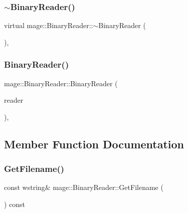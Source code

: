 \subsubsection{\texorpdfstring{$\sim$\+Binary\+Reader()}{~BinaryReader()}}
{\footnotesize\ttfamily virtual mage\+::\+Binary\+Reader\+::$\sim$\+Binary\+Reader (\begin{DoxyParamCaption}{ }\end{DoxyParamCaption})\hspace{0.3cm}{\ttfamily [virtual]}, {\ttfamily [default]}}

\hypertarget{classmage_1_1_binary_reader_a8c1ff948f1d056439f3d8cc37d7f507c}{}\label{classmage_1_1_binary_reader_a8c1ff948f1d056439f3d8cc37d7f507c} 
\subsubsection{\texorpdfstring{Binary\+Reader()}{BinaryReader()}\hspace{0.1cm}{\footnotesize\ttfamily [2/2]}}
{\footnotesize\ttfamily mage\+::\+Binary\+Reader\+::\+Binary\+Reader (\begin{DoxyParamCaption}\item[{const \hyperlink{classmage_1_1_binary_reader}{Binary\+Reader} \&}]{reader }\end{DoxyParamCaption})\hspace{0.3cm}{\ttfamily [private]}, {\ttfamily [delete]}}



\subsection{Member Function Documentation}
\hypertarget{classmage_1_1_binary_reader_a10a0ec56fe7f8e63964ffca2afe019a3}{}\label{classmage_1_1_binary_reader_a10a0ec56fe7f8e63964ffca2afe019a3} 
\subsubsection{\texorpdfstring{Get\+Filename()}{GetFilename()}}
{\footnotesize\ttfamily const wstring\& mage\+::\+Binary\+Reader\+::\+Get\+Filename (\begin{DoxyParamCaption}{ }\end{DoxyParamCaption}) const}

